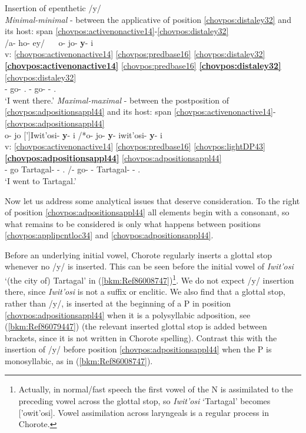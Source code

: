 \documentclass[output=paper]{langscibook}
\begin{document}
\ea  Insertion of epenthetic /y/\\ 
    \ea\label{bkm:Ref86008749} \textit{Minimal-minimal} - between the applicative of position \ref{chovpos:distaley32} and its host: span \ref{chovpos:activenonactive14}{}-\ref{chovpos:distaley32}\\ {
    \glll {} \textup{/a}\textup{{}-} \textup{ho}\textup{{}-} \textup{ey/}~ \MVRightarrow{}~ o{}- jo{}- \textbf{y}{}- i\\ 
    v: \ref{chovpos:activenonactive14} \ref{chovpos:predbase16} \ref{chovpos:distaley32} \MVRightarrow{} \textbf{\ref{chovpos:activenonactive14}} \ref{chovpos:predbase16} \textbf{\ref{chovpos:distaley32}} \ref{chovpos:distaley32}\\ 
    {} \First{}- go- \Ap.\Dist{} \textsc{\MVRightarrow{}} \First{}- go- \Epen{}- \Ap.\Dist{} \\ 
    \glt`I went there.'
    }
    \ex\label{bkm:Ref86008747} \textit{Maximal-maximal} - between the postposition of \ref{chovpos:adpositionsappl44} and its host: span \ref{chovpos:activenonactive14}{}-\ref{chovpos:adpositionsappl44}\\ {
    \glll {} o- jo [']Iwit'osi- \textbf{y}{}- i /*o- jo- \textbf{y}{}- iwit'osi- \textbf{y}{}- i\\ 
    v: \ref{chovpos:activenonactive14} \ref{chovpos:predbase16} \ref{chovpos:lightDP43} \textbf{\ref{chovpos:adpositionsappl44}} \ref{chovpos:adpositionsappl44} \\
    {} \First{}- go Tartagal- \Epen{}- \Ap.\Dist{} /\First{}- go- \Epen{}- Tartagal- \Epen{}- \Ap.\Dist{}\\ 
    \glt `I went to Tartagal.'
    }
    \z 
\z 

Now let us address some analytical issues that deserve consideration. To the right of position \ref{chovpos:adpositionsappl44} all elements begin with a consonant, so what remains to be considered is only what happens between positions \ref{chovpos:applipcntloc34} and \ref{chovpos:adpositionsappl44}. 

Before an underlying initial vowel, Chorote regularly inserts a glottal stop whenever no /y/ is inserted. This can be seen before the initial vowel of \textit{Iwit'osi} `(the city of) Tartagal' in (\ref{bkm:Ref86008747})\footnote{Actually, in normal/fast speech the first vowel of the N is assimilated to the preceding vowel across the glottal stop, so \textit{Iwit'osi} `Tartagal' becomes ['owit'osi]. Vowel assimilation across laryngeals is a regular process in Chorote.}. We do not expect /y/ insertion there, since \textit{Iwit'osi} is not a suffix or enclitic. We also find that a glottal stop, rather than /y/, is inserted at the beginning of a P in position \ref{chovpos:adpositionsappl44} when it is a polysyllabic adposition, see (\ref{bkm:Ref86079447}) (the relevant inserted glottal stop is added between brackets, since it is not written in Chorote spelling). Contrast this with the insertion of /y/ before position \ref{chovpos:adpositionsappl44} when the P is monosyllabic, as in (\ref{bkm:Ref86008747}).
\end{document}
